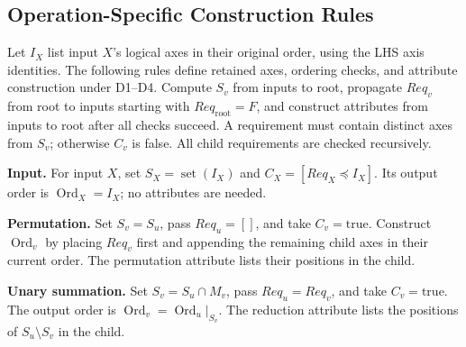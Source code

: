 \subsection{Operation-Specific Construction Rules}
\label{app:operation-construction-rules}
Let $I_X$ list input $X$'s logical axes in their original order, using the
LHS axis identities. The following rules define retained axes, ordering
checks, and attribute construction under D1--D4. Compute $S_v$ from inputs
to root, propagate $Req_v$ from root to inputs starting with
$Req_{\mathrm{root}}=F$, and construct attributes from inputs to root after
all checks succeed. A requirement must contain distinct axes from $S_v$;
otherwise $C_v$ is false. All child requirements are checked recursively.

\noindent\textbf{Input.}
For input $X$, set $S_X=\operatorname{set}(I_X)$ and
$C_X=[Req_X\preceq I_X]$. Its output order is
$\operatorname{Ord}_X=I_X$; no attributes are needed.

\noindent\textbf{Permutation.}
Set $S_v=S_u$, pass $Req_u=[]$, and take $C_v=\mathrm{true}$.
Construct $\operatorname{Ord}_v$ by placing $Req_v$ first and appending
the remaining child axes in their current order. The permutation attribute
lists their positions in the child.

\noindent\textbf{Unary summation.}
Set $S_v=S_u\cap M_v$, pass $Req_u=Req_v$, and take
$C_v=\mathrm{true}$. The output order is
$\operatorname{Ord}_v=\operatorname{Ord}_u|_{S_v}$.
The reduction attribute lists the positions of $S_u\setminus S_v$
in the child.

